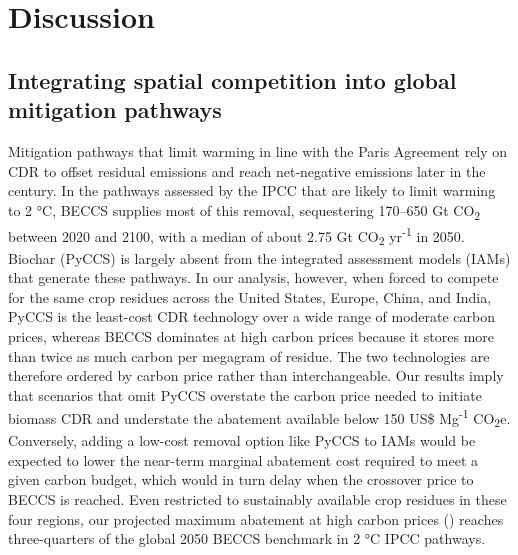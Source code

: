 \documentclass[
  letterpaper,
  twoside,
  twocolumn,
  9pt]{article}
\begin{document}
\FloatBarrier

\section{Discussion}\label{discussion}

\subsection{Integrating spatial competition into global mitigation
pathways}\label{integrating-spatial-competition-into-global-mitigation-pathways}

Mitigation pathways that limit warming in line with the Paris Agreement
\citep{unfccc2015paris} rely on CDR to offset residual emissions and
reach net-negative emissions later in the century. In the pathways
assessed by the IPCC that are likely to limit warming to 2 °C, BECCS
supplies most of this removal,\citep{ipcc2022wg3, edwards2026state}
sequestering 170--650 Gt CO\textsubscript{2} between 2020 and
2100,\citep{ipcc2022wg3} with a median of about 2.75 Gt
CO\textsubscript{2} yr\textsuperscript{-1} in 2050.\citep{babiker2022}
Biochar (PyCCS) is largely absent from the integrated assessment models
(IAMs) that generate these pathways.\citep{edwards2026state} In our
analysis, however, when forced to compete for the same crop residues
across the United States, Europe, China, and India, PyCCS is the
least-cost CDR technology over a wide range of moderate carbon prices,
whereas BECCS dominates at high carbon prices because it stores more
than twice as much carbon per megagram of residue. The two technologies
are therefore ordered by carbon price rather than interchangeable. Our
results imply that scenarios that omit PyCCS overstate the carbon price
needed to initiate biomass CDR and understate the abatement available
below 150 US\$ Mg\textsuperscript{-1} CO\textsubscript{2}e. Conversely,
adding a low-cost removal option like PyCCS to IAMs would be expected to
lower the near-term marginal abatement cost required to meet a given
carbon budget, which would in turn delay when the crossover price to
BECCS is reached. Even restricted to sustainably available crop residues
in these four regions, our projected maximum abatement at high carbon
prices () reaches three-quarters of the global 2050 BECCS benchmark in 2
°C IPCC pathways.\citep{babiker2022}
\end{document}
